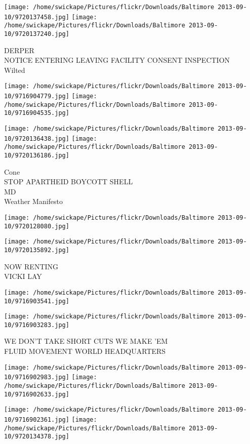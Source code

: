 \documentclass[10pt,letterpaper]{article}
\begin{document}
\vspace{0.25in}
\texttt{[image: /home/swickape/Pictures/flickr/Downloads/Baltimore 2013-09-10/9720137458.jpg]}
\texttt{[image: /home/swickape/Pictures/flickr/Downloads/Baltimore 2013-09-10/9720137240.jpg]}

DERPER\\
NOTICE ENTERING LEAVING FACILITY CONSENT INSPECTION\\
Wilted
\pagebreak

\texttt{[image: /home/swickape/Pictures/flickr/Downloads/Baltimore 2013-09-10/9716904779.jpg]}
\texttt{[image: /home/swickape/Pictures/flickr/Downloads/Baltimore 2013-09-10/9716904535.jpg]}

\texttt{[image: /home/swickape/Pictures/flickr/Downloads/Baltimore 2013-09-10/9720136438.jpg]}
\texttt{[image: /home/swickape/Pictures/flickr/Downloads/Baltimore 2013-09-10/9720136186.jpg]}

Cone\\
STOP APARTHEID BOYCOTT SHELL\\
MD\\
Weather Manifesto
\pagebreak

\texttt{[image: /home/swickape/Pictures/flickr/Downloads/Baltimore 2013-09-10/9720128080.jpg]}

\vspace{0.25in}
\texttt{[image: /home/swickape/Pictures/flickr/Downloads/Baltimore 2013-09-10/9720135892.jpg]}

NOW RENTING\\
VICKI LAY
\pagebreak

\texttt{[image: /home/swickape/Pictures/flickr/Downloads/Baltimore 2013-09-10/9716903541.jpg]}

\vspace{0.25in}
\texttt{[image: /home/swickape/Pictures/flickr/Downloads/Baltimore 2013-09-10/9716903283.jpg]}

WE DON'T TAKE SHORT CUTS WE MAKE 'EM\\
FLUID MOVEMENT WORLD HEADQUARTERS
\pagebreak

\texttt{[image: /home/swickape/Pictures/flickr/Downloads/Baltimore 2013-09-10/9716902983.jpg]}
\texttt{[image: /home/swickape/Pictures/flickr/Downloads/Baltimore 2013-09-10/9716902633.jpg]}

\texttt{[image: /home/swickape/Pictures/flickr/Downloads/Baltimore 2013-09-10/9716902361.jpg]}
\texttt{[image: /home/swickape/Pictures/flickr/Downloads/Baltimore 2013-09-10/9720134378.jpg]}
\end{document}
